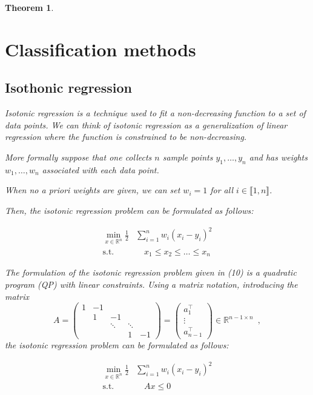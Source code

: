 \documentclass[12pt,preprint]{elsarticle}
\newtheorem{Theorem}{Theorem}
\begin{document}
\begin{Theorem}
\section{Classification methods}
\subsection{Isothonic regression}

Isotonic regression is a technique used to fit a non-decreasing function to a set of data points.
We can think of isotonic regression as a generalization of linear regression where the function is constrained to be non-decreasing.

More formally suppose that one collects $n$ sample points $y_1,\dots, y_n$ and has weights $w_1, \dots, w_n$ associated with each data point.

When no a priori weights are given, we can set $w_i = 1$ for all $i \in \llbracket 1, n \rrbracket$.

Then, the isotonic regression problem can be formulated as follows:

\begin{align}
\min_{x \in \mathbb{R}^n}
\frac{1}{2}
& \sum_{i=1}^{n} w_i (x_i - y_i)^2 \\
\text{s.t.} & \quad x_1 \leq x_2 \leq \ldots \leq x_n \nonumber
\end{align}

The formulation of the isotonic regression problem given in (10) is a quadratic program (QP) with linear constraints.
Using a matrix notation, introducing the matrix
$$A = \begin{pmatrix} 1 & -1 &                       &                       &    \\
  & 1  & -1                    &                       &    \\
  &    & \ddots & \ddots &    \\
  &    &                       & 1                     & -1\end{pmatrix}
 =
\begin{pmatrix}
a_1^\top \\
\vdots   \\
a_{n-1}^\top
\end{pmatrix}
 \in \mathbb{R}^{n-1 \times n}\enspace,
$$
the isotonic regression problem can be formulated as follows:

\begin{align}
\min_{x \in \mathbb{R}^n}
\frac{1}{2}
& \sum_{i=1}^{n} w_i (x_i - y_i)^2 \\
\text{s.t.} & \quad Ax \leq 0 \nonumber
\end{align}





\end{Theorem}
\end{document}
